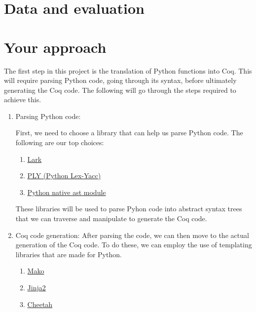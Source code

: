 \documentclass[11pt,A4]{article}
\newcommand{\blue}[1]{\textcolor{RoyalBlue}{#1}}
\newcommand{\instructions}[1]{\blue{\textit{#1}}}
\renewcommand{\instructions}[1]{}
\begin{document}
\section*{Data and evaluation}
\instructions{Do you have data to train/develop and test your system on? How
  will you evaluate your system?}

\section*{Your approach} 
\instructions{Describe how you want to tackle this task}
The first step in this project is the translation of Python functions into Coq. This will require parsing Python code, going through its syntax, before ultimately generating the Coq code. The following will go through the steps required to achieve this.
\begin{enumerate}
    \item Parsing Python code:\par
    First, we need to choose a library that can help us parse Python code. The following are our top choices:
    \begin{enumerate}
        \item \href{https://lark-parser.readthedocs.io/en/stable/index.html#}{Lark}
        \item \href{https://www.dabeaz.com/ply/ply.html}{PLY (Python Lex-Yacc)}
        \item \href{https://docs.python.org/3/library/ast.html}{Python native ast module}
    \end{enumerate}
    These libraries will be used to parse Pyhon code into abstract syntax trees that we can traverse and manipulate to generate the Coq code.
    \item Coq code generation:
    After parsing the code, we can then move to the actual generation of the Coq code. To do these, we can employ the use of templating libraries that are made for Python.
    \begin{enumerate}
        \item \href{https://www.makotemplates.org/}{Mako}
        \item \href{https://jinja.palletsprojects.com/en/stable/}{Jinja2}
        \item \href{https://cheetahtemplate.org/}{Cheetah}
    \end{enumerate}
\end{enumerate}
\end{document}
